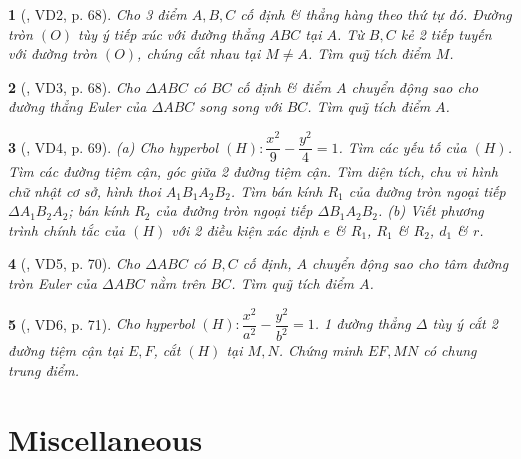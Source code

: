 \documentclass{article}
\newtheorem{baitoan}{}
\begin{document}
\begin{baitoan}[\cite{Hai_Hung_Thu_Tung_ncpt_Toan_10_tap_2}, VD2, p. 68]
	Cho 3 điểm $A,B,C$ cố định \& thẳng hàng theo thứ tự đó. Đường tròn $(O)$ tùy ý tiếp xúc với đường thẳng $ABC$ tại $A$. Từ $B,C$ kẻ 2 tiếp tuyến với đường tròn $(O)$, chúng cắt nhau tại $M\ne A$. Tìm quỹ tích điểm $M$.
\end{baitoan}

\begin{baitoan}[\cite{Hai_Hung_Thu_Tung_ncpt_Toan_10_tap_2}, VD3, p. 68]
	Cho $\Delta ABC$ có $BC$ cố định \& điểm $A$ chuyển động sao cho đường thẳng Euler của $\Delta ABC$ song song với $BC$. Tìm quỹ tích điểm $A$.
\end{baitoan}

\begin{baitoan}[\cite{Hai_Hung_Thu_Tung_ncpt_Toan_10_tap_2}, VD4, p. 69]
	(a) Cho hyperbol $(H):\dfrac{x^2}{9} - \dfrac{y^2}{4} = 1$. Tìm các yếu tố của $(H)$. Tìm các đường tiệm cận, góc giữa 2 đường tiệm cận. Tìm diện tích, chu vi hình chữ nhật cơ sở, hình thoi $A_1B_1A_2B_2$. Tìm bán kính $R_1$ của đường tròn ngoại tiếp $\Delta A_1B_2A_2$; bán kính $R_2$ của đường tròn ngoại tiếp $\Delta B_1A_2B_2$. (b) Viết phương trình chính tắc của $(H)$ với 2 điều kiện xác định $e$ \& $R_1$, $R_1$ \& $R_2$, $d_1$ \& $r$.
\end{baitoan}

\begin{baitoan}[\cite{Hai_Hung_Thu_Tung_ncpt_Toan_10_tap_2}, VD5, p. 70]
	Cho $\Delta ABC$ có $B,C$ cố định, $A$ chuyển động sao cho tâm đường tròn Euler của $\Delta ABC$ nằm trên $BC$. Tìm quỹ tích điểm $A$.
\end{baitoan}

\begin{baitoan}[\cite{Hai_Hung_Thu_Tung_ncpt_Toan_10_tap_2}, VD6, p. 71]
	Cho hyperbol $(H):\dfrac{x^2}{a^2} - \dfrac{y^2}{b^2} = 1$. 1 đường thẳng $\Delta$ tùy ý cắt 2 đường tiệm cận tại $E,F$, cắt $(H)$ tại $M,N$. Chứng minh $EF,MN$ có chung trung điểm.
\end{baitoan}


\section{Miscellaneous}


\printbibliography[heading=bibintoc]
	
\end{document}
